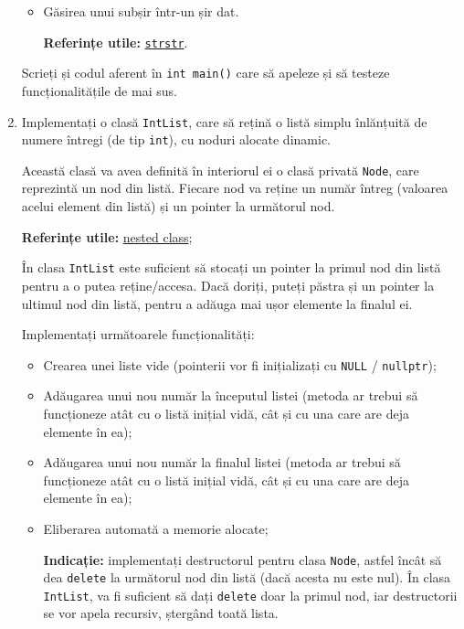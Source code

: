 \begin{enumerate}
\begin{itemize}
        \item Găsirea unui subșir într-un șir dat.

        \textbf{Referințe utile:} \href{https://en.cppreference.com/w/cpp/string/byte/strstr}{\texttt{strstr}}.
    \end{itemize}

    Scrieți și codul aferent în \texttt{int main()} care să apeleze și să testeze funcționalitățile de mai sus. 

    \item Implementați o clasă \texttt{IntList}, care să rețină o listă simplu înlănțuită de numere întregi (de tip \texttt{int}), cu noduri alocate dinamic.
    
    Această clasă va avea definită în interiorul ei o clasă privată \texttt{Node}, care reprezintă un nod din listă. Fiecare nod va reține un număr întreg (valoarea acelui element din listă) și un pointer la următorul nod.

    \textbf{Referințe utile:} \href{https://en.cppreference.com/w/cpp/language/nested_types}{nested class};

    În clasa \texttt{IntList} este suficient să stocați un pointer la primul nod din listă pentru a o putea reține/accesa. Dacă doriți, puteți păstra și un pointer la ultimul nod din listă, pentru a adăuga mai ușor elemente la finalul ei.

    Implementați următoarele funcționalități:
    \begin{itemize}
        \item Crearea unei liste vide (pointerii vor fi inițializați cu \texttt{NULL} / \texttt{nullptr});
        
        \item Adăugarea unui nou număr la începutul listei (metoda ar trebui să funcționeze atât cu o listă inițial vidă, cât și cu una care are deja elemente în ea);
        
        \item Adăugarea unui nou număr la finalul listei (metoda ar trebui să funcționeze atât cu o listă inițial vidă, cât și cu una care are deja elemente în ea);
        
        \item Eliberarea automată a memorie alocate;

        \textbf{Indicație:} implementați destructorul pentru clasa \texttt{Node}, astfel încât să dea \texttt{delete} la următorul nod din listă (dacă acesta nu este nul). În clasa \texttt{IntList}, va fi suficient să dați \texttt{delete} doar la primul nod, iar destructorii se vor apela recursiv, ștergând toată lista.
        

\end{itemize}
\end{enumerate}
